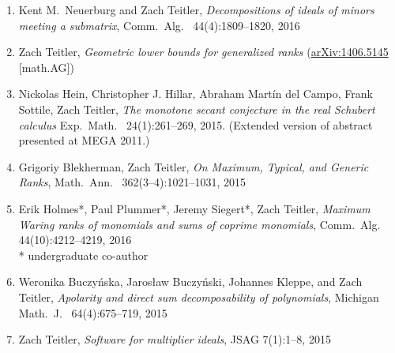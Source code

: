 \documentclass[12pt]{article}
\begin{document}
\begin{enumerate}[1.]
\item Kent M.\ Neuerburg and Zach Teitler,
\emph{Decompositions of ideals of minors meeting a submatrix},
Comm.\ Alg.\
44(4):1809--1820, 2016

\item Zach Teitler,
\emph{Geometric lower bounds for generalized ranks} %
(\href{http://arxiv.org/abs/1406.5145}{arXiv:1406.5145} [math.AG])

\item Nickolas Hein, Christopher J. Hillar, Abraham Mart\'in del Campo, Frank Sottile, Zach Teitler,
\emph{The monotone secant conjecture in the real Schubert calculus}
Exp.\ Math.\
24(1):261--269, 2015.
(Extended version of abstract presented at MEGA 2011.)

\item Grigoriy Blekherman, Zach Teitler,
\emph{On Maximum, Typical, and Generic Ranks},
Math.\ Ann.\
362(3--4):1021--1031, 2015

\item Erik Holmes*, Paul Plummer*, Jeremy Siegert*, Zach Teitler,
\emph{Maximum Waring ranks of monomials and sums of coprime monomials},
Comm.\ Alg.\
44(10):4212--4219, 2016\\
* undergraduate co-author

\item Weronika Buczy\'nska, Jaros{\l}aw Buczy\'nski, Johannes Kleppe, and Zach Teitler,
\emph{Apolarity and direct sum decomposability of polynomials},
Michigan Math.\ J.\
64(4):675--719, 2015

\item Zach Teitler,
\emph{Software for multiplier ideals},
JSAG
7(1):1--8, 2015


\end{enumerate}
\end{document}
